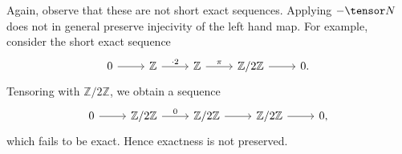 Again, observe that these are not short exact sequences. Applying
${-}\tensor N$ does not in general preserve injecivity of the left hand
map. For example, consider the short exact sequence
\[\begin{tikzcd}
	0\ar[r] & \mathbb{Z}\ar[r, "\cdot 2"] & \mathbb{Z}\ar[r, "\pi"] & \mathbb{Z}/2\mathbb{Z}\ar[r] & 0.
\end{tikzcd}\]
Tensoring with $\mathbb{Z}/2\mathbb{Z}$, we obtain a sequence
\[\begin{tikzcd}
	0\ar[r] & \mathbb{Z}/2\mathbb{Z}\ar[r, "0"] & \mathbb{Z}/2\mathbb{Z}\ar[r] & \mathbb{Z}/2\mathbb{Z}\ar[r] & 0,
\end{tikzcd}\]
which fails to be exact. Hence exactness is not preserved.
